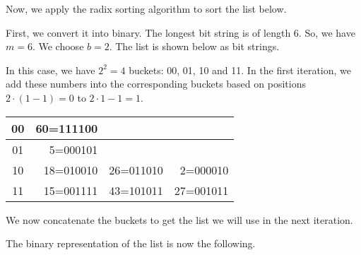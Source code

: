 \documentclass[a4paper, openany]{memoir}
\begin{document}
Now, we apply the radix sorting algorithm to sort the list below.
\begin{figure}[H]
    \centering
\end{figure}
\noindent First, we convert it into binary. The longest bit string is of length 6. So, we have $m = 6$. We choose $b = 2$. The list is shown below as bit strings.
\begin{figure}[H]
    \centering
\end{figure}
\noindent In this case, we have $2^2 = 4$ buckets: 00, 01, 10 and 11. In the first iteration, we add these numbers into the corresponding buckets based on positions $2 \cdot (1 - 1) = 0$ to $2 \cdot 1 - 1 = 1$.
\begin{table}[H]
    \centering
    \begin{tabular}{c|rrr}
        00 & 60=1111{\color{red}00} \\
        \hline
        01 & 5=0001{\color{red}01} \\
        \hline
        10 & 18=0100{\color{red}10} & 26=0110{\color{red}10} & 2=0000{\color{red}10} \\
        \hline
        11 & 15=0011{\color{red}11} & 43=1010{\color{red}11} & 27=0010{\color{red}11}
    \end{tabular}
\end{table}
\noindent We now concatenate the buckets to get the list we will use in the next iteration.
\begin{figure}[H]
    \centering
\end{figure}
\noindent The binary representation of the list is now the following.
\end{document}

